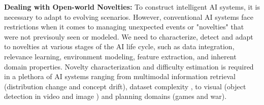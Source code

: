 \textbf{Dealing with Open-world Novelties:}
%
%
To construct intelligent AI systems, it is necessary to adapt to evolving scenarios. However, conventional AI systems face restrictions when it comes to managing unexpected events or "novelties" that were not previsouly seen or modeled. We need to characterize, detect and adapt to novelties at various stages of the AI life cycle, such as data integration, relevance learning, environment modeling, feature extraction, and inherent domain properties. Novelty characterization and difficulty estimation is required in a plethora of AI systems ranging from multimodal information retrieval \cite{solaiman2022open} (distribution change and concept drift), dataset complexity \cite{solaiman2023domainComplexity}, to visual (object detection in video and image \cite{nesen2021dataset}) and planning domains (games \cite{solaiman2022measurement} and war).
